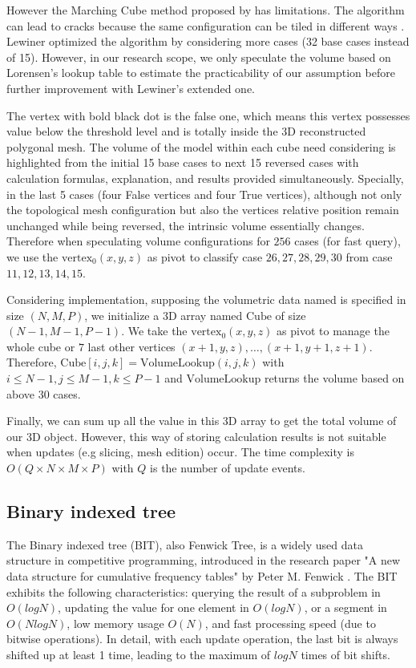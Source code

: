 \documentclass[11pt]{article}
\begin{document}
\begin{multicols}{2}

However the Marching Cube method proposed by \cite{loren} has limitations. The algorithm can lead to cracks because the same configuration can be tiled in different ways \cite{lewiner}. Lewiner optimized the algorithm by considering more cases (32 base cases instead of 15). However, in our research scope, we only speculate the volume based on Lorensen's lookup table to estimate the practicability of our assumption before further improvement with Lewiner's extended one.

The vertex with bold black dot is the false one, which means this vertex possesses value below the threshold level and is totally inside the 3D reconstructed polygonal mesh. The volume of the model within each cube need considering is highlighted from the initial 15 base cases to next 15 reversed cases with calculation formulas, explanation, and results provided simultaneously. Specially, in the last 5 cases (four False vertices and four True vertices), although not only the topological mesh configuration but also the vertices relative position remain unchanged while being reversed, the intrinsic volume essentially changes. Therefore when speculating volume configurations for $256$ cases (for fast query), we use the $\text{vertex}_0 (x,y,z)$ as pivot to classify case $26,27,28,29,30$ from case $11,12,13,14,15$.

Considering implementation, supposing the volumetric data named is specified in size $(N,M,P)$, we initialize a 3D array named $\text{Cube}$ of size $(N-1, M-1, P-1)$. We take the $\text{vertex}_0 (x,y,z)$ as pivot to manage the whole cube or $7$ last other vertices $(x+1, y,z), \dots, (x+1,y+1,z+1)$. Therefore, $\text{Cube}[i,j,k] = \text{VolumeLookup}(i,j,k)$ with $i \leq N-1, j \leq M-1, k \leq P-1$ and $\text{VolumeLookup}$ returns the volume based on above 30 cases.

Finally, we can sum up all the value in this 3D array to get the total volume of our 3D object. However, this way of storing calculation results is not suitable when updates (e.g slicing, mesh edition) occur. The time complexity is $O(Q \times N \times M \times P)$ with $Q$ is the number of update events.

\subsection{Binary indexed tree}
The Binary indexed tree (BIT), also Fenwick Tree, is a widely used data structure in competitive programming, introduced in the research paper "A new data structure for cumulative frequency tables" by Peter M. Fenwick \cite{fenwick}. The BIT exhibits the following characteristics: querying the result of a subproblem in $O(logN)$, updating the value for one element in $O(logN)$, or a segment in $O(NlogN)$, low memory usage $O(N)$, and fast processing speed (due to bitwise operations). In detail, with each update operation, the last bit is always shifted up at least 1 time, leading to the maximum of $logN$ times of bit shifts.


\end{multicols}
\end{document}

